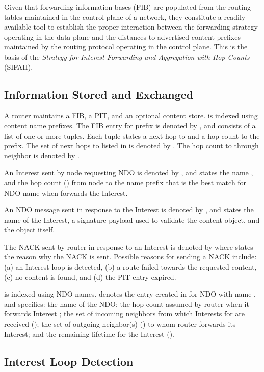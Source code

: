 \documentclass{ancs15-alternate}
\begin{document}
Given that 
forwarding information bases (FIB)  are populated from the routing tables maintained in the control plane of a network, they  constitute  
a readily-available tool to establish the proper interaction between the forwarding strategy operating in the data plane and the distances to advertised content prefixes maintained by the routing protocol  operating in the control plane.  This is the basis of the 
{\em Strategy for Interest  Forwarding and Aggregation with Hop-Counts} (SIFAH).


\subsection{Information Stored and Exchanged}

A router maintains a FIB, a PIT, and an optional  content store.
 is indexed using content name prefixes. The  FIB entry for  prefix  is denoted by , and consists of a list of one or more  tuples. Each tuple 
states a next hop to  and a hop count to the prefix.
The set of next hops to  listed in  is denoted by
.
The hop count to  through neighbor  is denoted by  . 


An Interest sent by node  requesting NDO  is denoted by  , and states the name , and the hop count () from node   to the name prefix  that is the best match for NDO name   when  forwards the Interest. 


An NDO message sent in response to the Interest   is denoted by  , and  states the name  of the Interest,  a  signature payload  used to validate the content object, and the object  itself. 

The NACK sent by router  in response to  an Interest 
is denoted by   where  states the reason why the NACK is sent.  Possible reasons for sending a NACK include: (a) an Interest loop is detected, (b) a  route failed towards the requested content, (c) no content is found, and (d) the PIT entry expired.

 is indexed using NDO names.
  denotes the entry created in  for NDO with name , and specifies: the name of the NDO; 
the hop count  assumed by router  when it forwards Interest ; the set of incoming neighbors from which  Interests for  are received (); the set of outgoing neighbor(s) () to whom router  forwards its Interest;  
and the remaining lifetime for the Interest ().

\subsection{Interest Loop Detection}
\end{document}
